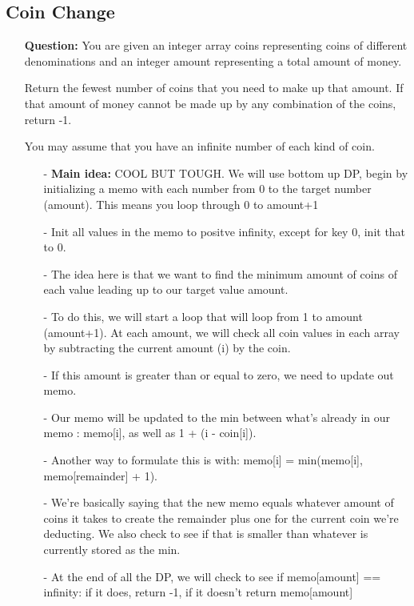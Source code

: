 \documentclass[12pt]{article}
\begin{document}
\subsection{Coin Change}
\begin{enumerate}
  \item[] \textbf{Question:} You are given an integer array coins representing coins of different denominations and an integer amount representing a total amount of money.

Return the fewest number of coins that you need to make up that amount. If that amount of money cannot be made up by any combination of the coins, return -1.

You may assume that you have an infinite number of each kind of coin.
  
    \begin{enumerate}
      \item[-] \textbf{Main idea:} COOL BUT TOUGH. We will use bottom up DP, begin by initializing a memo with each number from 0 to the target number (amount). This means you loop through 0 to amount+1
      \item[-] Init all values in the memo to positve infinity, except for key 0, init that to 0.
      \item[-] The idea here is that we want to find the minimum amount of coins of each value leading up to our target value amount.
      \item[-] To do this, we will start a loop that will loop from 1 to amount (amount+1). At each amount, we will check all coin values in each array by subtracting the current amount (i) by the coin. 
      \item[-] If this amount is greater than or equal to zero, we need to update out memo. 
      \item[-] Our memo will be updated to the min between what's already in our memo : memo[i], as well as 1 + (i - coin[i]).
      \item[-] Another way to formulate this is with: memo[i] = min(memo[i], memo[remainder] + 1). 
      \item[-] We're basically saying that the new memo equals whatever amount of coins it takes to create the remainder plus one for the current coin we're deducting. We also check to see if that is smaller than whatever is currently stored as the min.
      \item[-] At the end of all the DP, we will check to see if memo[amount] == infinity: if it does, return -1, if it doesn't return memo[amount]


    \end{enumerate}
\end{enumerate}
\end{document}
